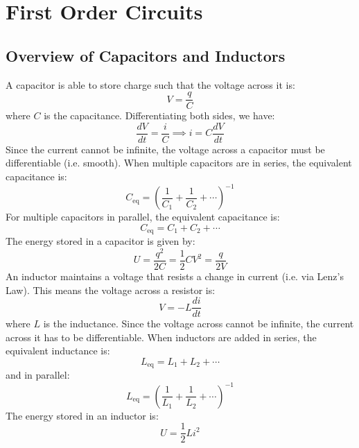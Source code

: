 \documentclass{article}
\begin{document}
\section{First Order Circuits}
\subsection{Overview of Capacitors and Inductors}
A capacitor is able to store charge such that the voltage across it is:
\begin{equation}
    V = \frac{q}{C}
\end{equation}
where $C$ is the capacitance. Differentiating both sides, we have:
\begin{equation}
    \frac{dV}{dt} = \frac{i}{C} \implies i = C\frac{dV}{dt}
\end{equation}
Since the current cannot be infinite, the voltage across a capacitor must be differentiable (i.e. smooth). When multiple capacitors are in series, the equivalent capacitance is:
\begin{equation}
    C_\text{eq} = \left(\frac{1}{C_1}+\frac{1}{C_2} + \cdots\right)^{-1}
\end{equation}
For multiple capacitors in parallel, the equivalent capacitance is:
\begin{equation}
    C_\text{eq} = C_1+C_2+\cdots
\end{equation}
The energy stored in a capacitor is given by:
\begin{equation}
    U = \frac{q^2}{2C} = \frac{1}{2}CV^2 = \frac{q}{2V}
\end{equation}
An inductor maintains a voltage that resists a change in current (i.e. via Lenz's Law). This means the voltage across a resistor is:
\begin{equation}
    V = -L\frac{di}{dt}
\end{equation}
where $L$ is the inductance. Since the voltage across cannot be infinite, the current across it has to be differentiable. When inductors are added in series, the equivalent inductance is:
\begin{equation}
    L_\text{eq} = L_1 + L_2 + \cdots
\end{equation}
and in parallel:
\begin{equation}
    L_\text{eq} = \left(\frac{1}{L_1} + \frac{1}{L_2}+\cdots\right)^{-1}
\end{equation}
The energy stored in an inductor is:
\begin{equation}
    U = \frac{1}{2}Li^2
\end{equation}
\end{document}
